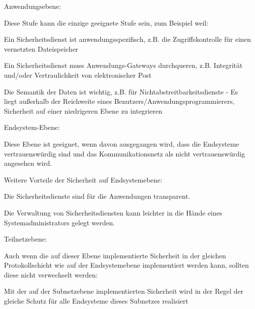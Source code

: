 \documentclass[a4paper]{article}
\begin{document}
\begin{multicols}{3}
      \begin{itemize*}
            \item Anwendungsebene:
            \begin{itemize*}
                  \item Diese Stufe kann die einzige geeignete Stufe sein, zum Beispiel weil:
                  \begin{itemize*} \item Ein Sicherheitsdienst ist anwendungsspezifisch, z.B. die Zugriffskontrolle für einen vernetzten Dateispeicher \item Ein Sicherheitsdienst muss Anwendungs-Gateways durchqueren, z.B. Integrität und/oder Vertraulichkeit von elektronischer Post \item Die Semantik der Daten ist wichtig, z.B. für Nichtabstreitbarkeitsdienste - Es liegt außerhalb der Reichweite eines Benutzers/Anwendungsprogrammierers, Sicherheit auf einer niedrigeren Ebene zu integrieren \end{itemize*}
            \end{itemize*}
            \item Endsystem-Ebene:
            \begin{itemize*}
                  \item Diese Ebene ist geeignet, wenn davon ausgegangen wird, dass die Endsysteme vertrauenswürdig sind und das Kommunikationsnetz als nicht vertrauenswürdig angesehen wird.
                  \item Weitere Vorteile der Sicherheit auf Endsystemebene:
                  \begin{itemize*} \item Die Sicherheitsdienste sind für die Anwendungen transparent. \item Die Verwaltung von Sicherheitsdiensten kann leichter in die Hände eines Systemadministrators gelegt werden. \end{itemize*}
            \end{itemize*}
            \item Teilnetzebene:
            \begin{itemize*}
                  \item Auch wenn die auf dieser Ebene implementierte Sicherheit in der gleichen Protokollschicht wie auf der Endsystemebene implementiert werden kann, sollten diese nicht verwechselt werden:
                  \begin{itemize*} \item Mit der auf der Subnetzebene implementierten Sicherheit wird in der Regel der gleiche Schutz für alle Endsysteme dieses Subnetzes realisiert \end{itemize*}

\end{itemize*}
\end{itemize*}
\end{multicols}
\end{document}
